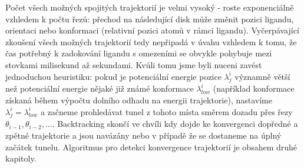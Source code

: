 Počet všech možných spojitých trajektorií je velmi vysoký - roste exponenciálně vzhledem
k počtu řezů: přechod na následující disk může změnit pozici ligandu, orientaci
nebo konformaci (relativní pozici atomů v rámci ligandu). Vyčerpávající zkoušení
všech možných trajektorií tedy nepřipadá v úvahu vzhledem k tomu, že čas
potřebný k zadokování ligandu s omezeními se obvykle pohybuje mezi stovkami
milisekund až sekundami. Kvůli tomu jsme byli nuceni zavést jednoduchou heuristiku:
pokud je potenciální energie pozice $ \lambda^i_j $ významně větší než potenciální
energie nějaké již známé konformace $ \lambda^i_{low} $ (například konformace
získaná během výpočtu dolního odhadu na energii trajektorie), nastavíme
$ \lambda^i_j = \lambda^i_{low} $ a začneme prohledávat tunel z tohoto místa
směrem dozadu přes řezy $ \theta_{i-1}, \theta_{i-2}, \dots $. Backtracking
skončí ve chvíli kdy dojde ke konvergenci dopředné a zpětné trajektorie a jsou
navázány nebo v případě že se dostaneme na úplný začátek tunelu.
Algoritmus pro detekci konvergence trajektorií je obsahem druhé kapitoly.

